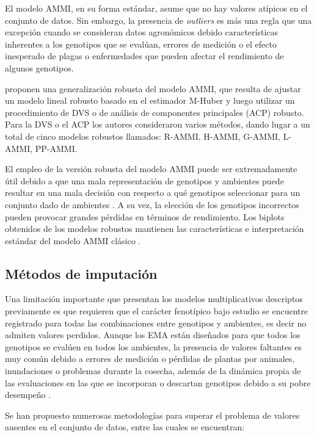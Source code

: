 El modelo AMMI, en su forma estándar, asume que no hay valores atípicos en el conjunto de datos. Sin embargo, la presencia de \emph{outliers} es más una regla que una excepción cuando se consideran datos agronómicos debido características inherentes a los genotipos que se evalúan, errores de medición o el efecto inesperado de plagas o enfermedades que pueden afectar el rendimiento de algunos genotipos.

\citet{Rodriguesetal2016} proponen una generalización robusta del modelo AMMI, que resulta de ajustar un modelo lineal robusto basado en el estimador M-Huber \citep{Huber1981} y luego utilizar un procedimiento de DVS o de análisis de componentes principales (ACP) robusto. Para la DVS o el ACP los autores consideraron varios métodos, dando lugar a un total de cinco modelos robustos llamados: R-AMMI, H-AMMI, G-AMMI, L-AMMI, PP-AMMI. 

El empleo de la versión robusta del modelo AMMI puede ser extremadamente útil debido a que una mala representación de genotipos y ambientes puede resultar en una mala decisión con respecto a qué genotipos seleccionar para un conjunto dado de ambientes \citep{GauchZobel1997, Yanetal2000}. A su vez, la elección de los genotipos incorrectos pueden provocar grandes pérdidas en términos de rendimiento. Los biplots obtenidos de los modelos robustos mantienen las características e interpretación estándar del modelo AMMI clásico \citep{Rodriguesetal2016}.


\subsection{Métodos de imputación}


Una limitación importante que presentan los modelos multiplicativos descriptos previamente es que requieren que el carácter fenotípico bajo estudio se encuentre registrado para todas las combinaciones entre genotipos y ambientes, es decir no admiten valores perdidos. Aunque los EMA están diseñados para que todos los genotipos se evalúen en todos los ambientes, la presencia de valores faltantes es muy común debido a errores de medición o pérdidas de plantas por animales, inundaciones o problemas durante la cosecha, además de la dinámica propia de las evaluaciones en las que se incorporan o descartan genotipos debido a su pobre desempeño \citep{HillRosenberg1985}.

Se han propuesto numerosas metodologías para superar el problema de valores ausentes en el conjunto de datos, entre las cuales se encuentran:


